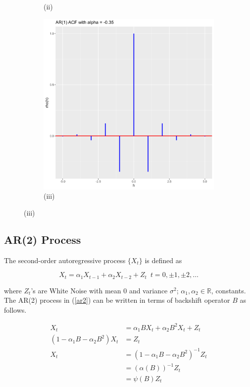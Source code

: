 \documentclass[11pt, a4paper]{article}
\begin{document}
\begin{figure}[h!]
\begin{subfigure}[t]{0.3\textwidth}
	\caption*{(ii)}
  \end{subfigure}
  \hfill
  \begin{subfigure}[t]{0.3\textwidth}
    \includegraphics[width=\linewidth]{alpha_negative_0.35.png}
    \caption*{(iii)}
  \end{subfigure}
\end{figure}

\subsection{AR(2) Process}

The second-order autoregressive process $\{X_t\}$ is defined as

\begin{equation}\label{ar2}
X_t = \alpha_1 X_{t-1} + \alpha_2 X_{t-2} + Z_t \,\,\, t = 0, \pm 1, \pm 2, \ldots
\end{equation}

where $Z_t$'s are White Noise with mean $0$ and variance $\sigma^2$; $\alpha_1, \alpha_2 \in \mathbb{R}$, constants. \\

The AR(2) process in (\ref{ar2}) can be written in terms of backshift operator $B$ as follows.

\begin{align*}
X_t &= \alpha_1 BX_t + \alpha_2 B^2 X_t + Z_t \\[0.25em]
\left( 1- \alpha_1 B - \alpha_2 B^2 \right) X_t &= Z_t \\[0.25em]
X_t &= \left( 1- \alpha_1 B - \alpha_2 B^2 \right)^{-1} Z_t \\[0.25em]
&= \left( \alpha (B) \right)^{-1} Z_t \\[0.25em]
&= \psi(B) Z_t
\end{align*}
\end{document}
